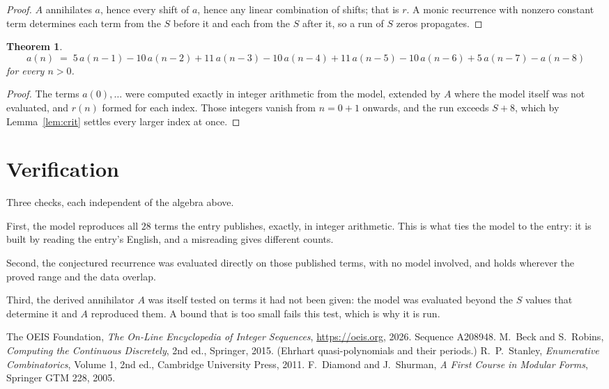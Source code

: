 \documentclass[11pt,a4paper]{article}
\theoremstyle{plain}
\newtheorem{theorem}{Theorem}
\theoremstyle{definition}
\begin{document}
\begin{proof}
$A$ annihilates $a$, hence every shift of $a$, hence any linear combination of shifts; that is
$r$. A monic recurrence with nonzero constant term determines each term from the $S$ before it
and each from the $S$ after it, so a run of $S$ zeros propagates.
\end{proof}

\begin{theorem}
\[
a(n)\;=\;5\,a(n-1) - 10\,a(n-2) + 11\,a(n-3) - 10\,a(n-4) + 11\,a(n-5) - 10\,a(n-6) + 5\,a(n-7) - a(n-8)
\]
for every $n>0$.
\end{theorem}

\begin{proof}
The terms $a(0),\dots$ were computed exactly in integer arithmetic from the model, extended by
$A$ where the model itself was not evaluated, and $r(n)$ formed for each index. Those integers
vanish from $n=0+1$ onwards, and the run exceeds $S+8$, which by
Lemma~\ref{lem:crit} settles every larger index at once.
\end{proof}

\section{Verification}

Three checks, each independent of the algebra above.

First, the model reproduces all $28$ terms the entry publishes, exactly, in integer
arithmetic. This is what ties the model to the entry: it is built by reading the entry's
English, and a misreading gives different counts.

Second, the conjectured recurrence was evaluated directly on those published terms, with no
model involved, and holds wherever the proved range and the data overlap.

Third, the derived annihilator $A$ was itself tested on terms it had not been given: the model
was evaluated beyond the $S$ values that determine it and $A$ reproduced them. A bound that is
too small fails this test, which is why it is run.

\begin{thebibliography}{9}
 The OEIS Foundation, \emph{The On-Line Encyclopedia of Integer
Sequences}, \url{https://oeis.org}, 2026. Sequence A208948.
 M.~Beck and S.~Robins, \emph{Computing the Continuous Discretely},
2nd ed., Springer, 2015. (Ehrhart quasi-polynomials and their periods.)
 R.~P.~Stanley, \emph{Enumerative Combinatorics}, Volume 1, 2nd ed.,
Cambridge University Press, 2011.
 F.~Diamond and J.~Shurman, \emph{A First Course in Modular Forms},
Springer GTM 228, 2005.
\end{thebibliography}
\end{document}
